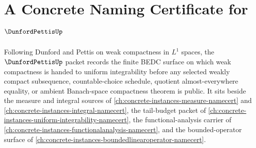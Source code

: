 \chapter{A Concrete Naming Certificate for $\DunfordPettisUp$}
\label{ch:concrete-instances-dunford-pettis-namecert}

Following Dunford and Pettis on weak compactness in $L^{1}$ spaces, the $\DunfordPettisUp$ packet records the finite BEDC surface on which weak compactness is handed to uniform integrability before any selected weakly compact subsequence, countable-choice schedule, quotient almost-everywhere equality, or ambient Banach-space compactness theorem is public. It sits beside the measure and integral sources of \autoref{ch:concrete-instances-measure-namecert} and \autoref{ch:concrete-instances-integral-namecert}, the tail-budget packet of \autoref{ch:concrete-instances-uniform-integrability-namecert}, the functional-analysis carrier of \autoref{ch:concrete-instances-functionalanalysis-namecert}, and the bounded-operator surface of \autoref{ch:concrete-instances-boundedlinearoperator-namecert}.


